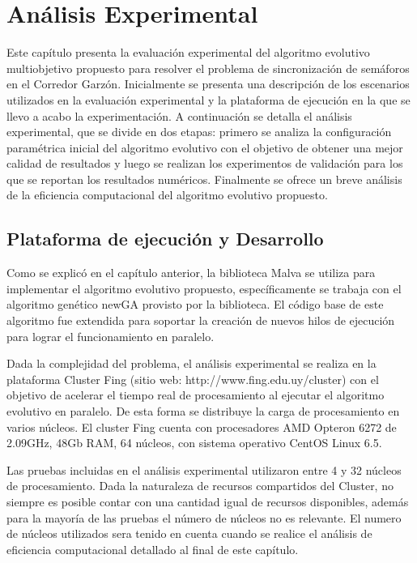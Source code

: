 \chapter{Análisis Experimental}
Este capítulo presenta la evaluación experimental del algoritmo evolutivo multiobjetivo propuesto para resolver el problema de sincronización de semáforos en el Corredor Garzón. Inicialmente se presenta una descripción de los escenarios utilizados en la evaluación experimental y la plataforma de ejecución en la que se llevo a acabo la experimentación. A continuación se detalla el análisis experimental, que se divide en dos etapas: primero se analiza la configuración paramétrica inicial del algoritmo evolutivo con el objetivo de obtener una mejor calidad de resultados y luego se realizan los experimentos de validación para los que se reportan los resultados numéricos. Finalmente se ofrece un breve análisis de la eficiencia computacional del algoritmo evolutivo propuesto.



\section{Plataforma de ejecución y Desarrollo}
Como se explicó en el capítulo anterior, la biblioteca Malva se utiliza para implementar el algoritmo evolutivo propuesto, específicamente se trabaja con el algoritmo genético newGA provisto por la biblioteca. El código base de este algoritmo fue extendida para soportar la creación de nuevos hilos de ejecución para lograr el funcionamiento en paralelo.

Dada la complejidad del problema, el análisis experimental  se realiza en la plataforma Cluster Fing (sitio web: http://www.fing.edu.uy/cluster) con el objetivo de acelerar el tiempo real de procesamiento al ejecutar el algoritmo evolutivo en paralelo. De esta forma se distribuye la carga de procesamiento en varios núcleos. El cluster Fing cuenta con procesadores AMD Opteron 6272 de 2.09GHz, 48Gb RAM, 64 núcleos, con sistema operativo CentOS Linux 6.5.

Las pruebas incluidas en el análisis experimental utilizaron entre 4 y 32 núcleos de procesamiento. Dada la naturaleza de recursos compartidos del Cluster, no siempre es posible contar con una cantidad igual de recursos disponibles, además para la mayoría de las pruebas el número de núcleos no es relevante. El numero de núcleos utilizados sera tenido en cuenta cuando se realice el análisis de eficiencia computacional detallado al final de este capítulo.


